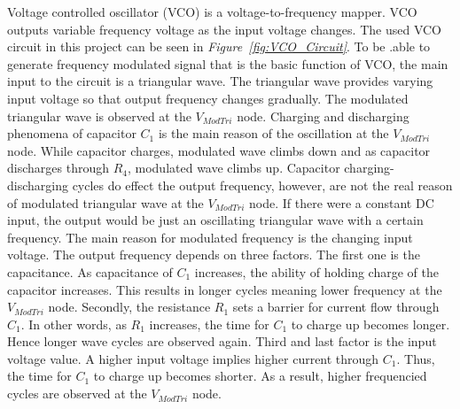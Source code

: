 \documentclass[paper]{IEEEtran}
\begin{document}
Voltage controlled oscillator (VCO) is a voltage-to-frequency mapper. VCO outputs variable frequency voltage as the input voltage changes. The used VCO circuit in this project can be seen in \textit{Figure~\ref{fig:VCO_Circuit}}. To be .able to generate frequency modulated signal that is the basic function of VCO, the main input to the circuit is a triangular wave. The triangular wave provides varying input voltage so that output frequency changes gradually. The modulated triangular wave is observed at the $V_{ModTri}$ node. Charging and discharging phenomena of capacitor $C_{1}$ is the main reason of the oscillation at the $V_{ModTri}$ node. While capacitor charges, modulated wave climbs down and as capacitor discharges through $R_{4}$, modulated wave climbs up. Capacitor charging-discharging cycles do effect the output frequency, however, are not the real reason of modulated triangular wave at the $V_{ModTri}$ node. If there were a constant DC input, the output would be just an oscillating triangular wave with a certain frequency. The main reason for modulated frequency is the changing input voltage. The output frequency depends on three factors. The first one is the capacitance. As capacitance of $C_{1}$ increases, the ability of holding charge of the capacitor increases. This results in longer cycles meaning lower frequency at the $V_{ModTri}$ node. Secondly, the resistance $R_{1}$ sets a barrier for current flow through $C_{1}$. In other words, as $R_{1}$ increases, the time for $C_{1}$ to charge up becomes longer. Hence longer wave cycles are observed again. Third and last factor is the input voltage value. A higher input voltage implies higher current through $C_{1}$. Thus, the time for $C_{1}$ to charge up becomes shorter. As a result, higher frequencied cycles are observed at the $V_{ModTri}$ node.
\end{document}

